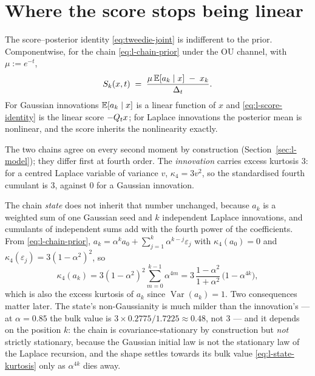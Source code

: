 \section{Where the score stops being linear}
\label{sec:l-nonlinear}\label{sec:l-K1}

The score--posterior identity \eqref{eq:tweedie-joint} is indifferent to the
prior. Componentwise, for the chain \eqref{eq:l-chain-prior} under the OU
channel, with $\mu := e^{-t}$,
\begin{equation}
  S_k(x,t) \;=\; \frac{\mu\, \mathbb{E}[a_k \mid x] \;-\; x_k}{\Delta_t} .
  \label{eq:l-score-identity}
\end{equation}
For Gaussian innovations $\mathbb{E}[a_k \mid x]$ is a linear function of
$x$ and \eqref{eq:l-score-identity} is the linear score $-Q_t x$; for Laplace
innovations the posterior mean is nonlinear, and the score inherits the
nonlinearity exactly.

The two chains agree on every second moment by construction
(Section~\ref{sec:l-model}); they differ first at fourth order. The
\emph{innovation} carries excess kurtosis $3$: for a centred Laplace variable
of variance $v$, $\kappa_4 = 3v^2$, so the standardised fourth cumulant is
$3$, against $0$ for a Gaussian innovation.

The chain \emph{state} does not inherit that number unchanged, because
$a_k$ is a weighted sum of one Gaussian seed and $k$ independent Laplace
innovations, and cumulants of independent sums add with the fourth power of
the coefficients. From \eqref{eq:l-chain-prior},
$a_k = \alpha^k a_0 + \sum_{j=1}^{k}\alpha^{k-j}\varepsilon_j$ with
$\kappa_4(a_0) = 0$ and
$\kappa_4(\varepsilon_j) = 3(1-\alpha^2)^2$, so
\begin{equation}
    \kappa_4(a_k)
    = 3(1-\alpha^2)^2\sum_{m=0}^{k-1}\alpha^{4m}
    = 3\,\frac{1-\alpha^2}{1+\alpha^2}\,\bigl(1-\alpha^{4k}\bigr),
    \label{eq:l-state-kurtosis}
\end{equation}
which is also the excess kurtosis of $a_k$ since
$\operatorname{Var}(a_k) = 1$. Two consequences matter later. The state's
non-Gaussianity is much milder than the innovation's --- at $\alpha = 0.85$
the bulk value is $3 \times 0.2775/1.7225 \approx 0.48$, not $3$ --- and it
depends on the position $k$: the chain is covariance-stationary by
construction but \emph{not} strictly stationary, because the Gaussian initial
law is not the stationary law of the Laplace recursion, and the shape settles
towards its bulk value \eqref{eq:l-state-kurtosis} only as $\alpha^{4k}$
dies away.

